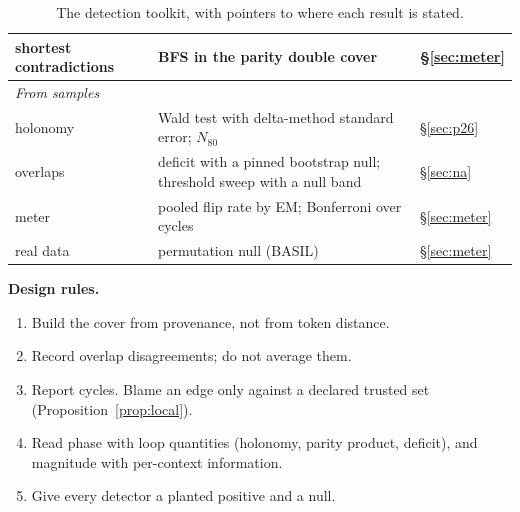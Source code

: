 \documentclass[11pt]{article}
\theoremstyle{definition}
\theoremstyle{remark}
\begin{document}
\begin{table}[!htbp]
\begin{tabular}{p{3.9cm}p{6.6cm}p{2.9cm}}
shortest contradictions & BFS in the parity double cover & \S\ref{sec:meter}\\
\midrule
\multicolumn{3}{l}{\emph{From samples}}\\
holonomy & Wald test with delta-method standard error; $N_{80}$ & \S\ref{sec:p26}\\
overlaps & deficit with a pinned bootstrap null; threshold sweep with a null band & \S\ref{sec:na}\\
meter & pooled flip rate by EM; Bonferroni over cycles & \S\ref{sec:meter}\\
real data & permutation null (BASIL) & \S\ref{sec:meter}\\
\bottomrule
\end{tabular}
\caption{The detection toolkit, with pointers to where each result is stated.}
\end{table}

\noindent\textbf{Design rules.}
\begin{enumerate}
  \item Build the cover from provenance, not from token distance.
  \item Record overlap disagreements; do not average them.
  \item Report cycles. Blame an edge only against a declared trusted set (Proposition~\ref{prop:local}).
  \item Read phase with loop quantities (holonomy, parity product, deficit), and magnitude with per-context information.
  \item Give every detector a planted positive and a null.
\end{enumerate}

\end{document}
